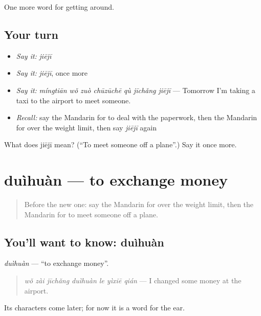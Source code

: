 \begin{grammarlens}[title={What you've built}]
One more word for getting around.
\end{grammarlens}

\subsection*{Your turn}
\begin{itemize}
\raggedright
  \item \emph{Say it:} \emph{jiējī}
  \item \emph{Say it:} \emph{jiējī}, once more
  \item \emph{Say it:} \emph{míngtiān wǒ zuò chūzūchē qù jīchǎng jiējī} — Tomorrow I'm taking a taxi to the airport to meet someone.
  \item \emph{Recall:} say the Mandarin for to deal with the paperwork, then the Mandarin for over the weight limit, then say \emph{jiējī} again
\end{itemize}

\begin{tcolorbox}[breakable,colback=teal!4,colframe=teal!35!black,title={Before you move on}]
What does jiējī mean? (\textquotedblleft{}To meet someone off a plane\textquotedblright{}.) Say it once more.
\end{tcolorbox}
\section[duìhuàn]{duìhuàn — to exchange money}

\label{lesson:ZH-C419-duihuan}



\begin{quote}
Before the new one: say the Mandarin for over the weight limit, then the Mandarin for to meet someone off a plane.
\end{quote}

\subsection*{You'll want to know: duìhuàn}
\emph{duìhuàn} — \textquotedblleft{}to exchange money\textquotedblright{}.

\begin{quote}
\emph{wǒ zài jīchǎng duìhuàn le yìxiē qián} — I changed some money at the airport.
\end{quote}

Its characters come later; for now it is a word for the ear.

